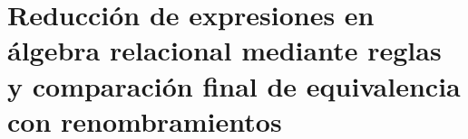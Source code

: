 \chapter{Reducción de expresiones en álgebra relacional mediante reglas y comparación final de equivalencia con renombramientos}
\noindent